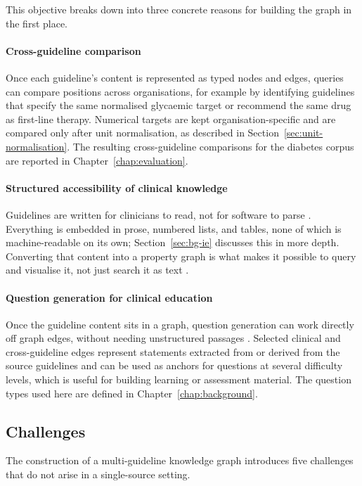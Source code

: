 This objective breaks down into three concrete reasons for building the graph in the first place.

\paragraph{Cross-guideline comparison}
Once each guideline's content is represented as typed nodes and edges, queries can compare positions across organisations, for example by identifying guidelines that specify the same normalised glycaemic target or recommend the same drug as first-line therapy. Numerical targets are kept organisation-specific and are compared only after unit normalisation, as described in Section~\ref{sec:unit-normalisation}. The resulting cross-guideline comparisons for the diabetes corpus are reported in Chapter~\ref{chap:evaluation}.

\paragraph{Structured accessibility of clinical knowledge }
Guidelines are written for clinicians to read, not for software to parse \cite{peleg2013}. Everything is embedded in prose, numbered lists, and tables, none of which is machine-readable on its own; Section~\ref{sec:bg-ie} discusses this in more depth. Converting that content into a property graph is what makes it possible to query and visualise it, not just search it as text \cite{li2020,harnoune2021}.

\paragraph{Question generation for clinical education }
Once the guideline content sits in a graph, question generation can work directly off graph edges, without needing unstructured passages \cite{guo2024,bi2020}. Selected clinical and cross-guideline edges represent statements extracted from or derived from the source guidelines and can be used as anchors for questions at several difficulty levels, which is useful for building learning or assessment material. The question types used here are defined in Chapter~\ref{chap:background}.

\subsection*{Challenges}

The construction of a multi-guideline knowledge graph introduces five challenges that do not arise in a single-source setting.

